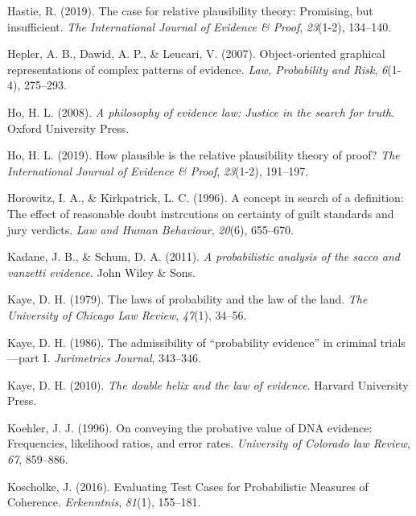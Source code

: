 \documentclass[11pt,dvipsnames,enabledeprecatedfontcommands]{scrartcl}
\begin{document}
\hypertarget{ref-hastie2019CaseRelativePlausibilitya}{}
Hastie, R. (2019). The case for relative plausibility theory: Promising,
but insufficient. \emph{The International Journal of Evidence \& Proof},
\emph{23}(1-2), 134--140.

\hypertarget{ref-hepler2007ObjectorientedGraphicalRepresentations}{}
Hepler, A. B., Dawid, A. P., \& Leucari, V. (2007). Object-oriented
graphical representations of complex patterns of evidence. \emph{Law,
Probability and Risk}, \emph{6}(1-4), 275--293.

\hypertarget{ref-ho2008philosophy}{}
Ho, H. L. (2008). \emph{A philosophy of evidence law: Justice in the
search for truth}. Oxford University Press.

\hypertarget{ref-lai2019HowPlausibleRelative}{}
Ho, H. L. (2019). How plausible is the relative plausibility theory of
proof? \emph{The International Journal of Evidence \& Proof},
\emph{23}(1-2), 191--197.

\hypertarget{ref-Horowitz1996}{}
Horowitz, I. A., \& Kirkpatrick, L. C. (1996). A concept in search of a
definition: The effect of reasonable doubt instrcutions on certainty of
guilt standards and jury verdicts. \emph{Law and Human Behaviour},
\emph{20}(6), 655--670.

\hypertarget{ref-kadane2011probabilistic}{}
Kadane, J. B., \& Schum, D. A. (2011). \emph{A probabilistic analysis of
the sacco and vanzetti evidence}. John Wiley \& Sons.

\hypertarget{ref-kaye79}{}
Kaye, D. H. (1979). The laws of probability and the law of the land.
\emph{The University of Chicago Law Review}, \emph{47}(1), 34--56.

\hypertarget{ref-kaye1986admissibility}{}
Kaye, D. H. (1986). The admissibility of ``probability evidence'' in
criminal trials---part I. \emph{Jurimetrics Journal}, 343--346.

\hypertarget{ref-Kaye2010The-Double-Heli}{}
Kaye, D. H. (2010). \emph{The double helix and the law of evidence}.
Harvard University Press.

\hypertarget{ref-Koehler1996On-Conveying-th}{}
Koehler, J. J. (1996). On conveying the probative value of DNA evidence:
Frequencies, likelihood ratios, and error rates. \emph{University of
Colorado law Review}, \emph{67}, 859--886.

\hypertarget{ref-koscholke2016evaluating}{}
Koscholke, J. (2016). Evaluating Test Cases for Probabilistic Measures
of Coherence. \emph{Erkenntnis}, \emph{81}(1), 155--181.
\end{document}

